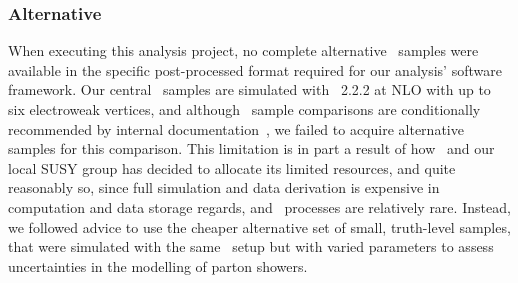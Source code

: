 \subsubsection{Alternative \diboson}
\label{sec:2ljets_diboson_alt}
When executing this analysis project, no complete alternative \diboson\ samples
were available in the specific post-processed format required for our analysis'
software framework.
Our central \diboson\ samples are simulated with \sherpa~2.2.2 at NLO with up
to six electroweak vertices, and although \diboson\ sample comparisons are
conditionally recommended by internal
documentation~\cite{atlas_twiki_susytheoretical}, we failed to acquire
alternative samples for this comparison.
This limitation is in part a result of how \atlas\ and our local SUSY group has
decided to allocate its limited resources, and quite reasonably so, since
full simulation and data derivation is expensive in computation and data
storage regards, and \diboson\ processes are relatively rare.
Instead, we followed advice to use the cheaper alternative set of small,
truth-level samples, that were simulated with the same \sherpa\ setup but with
varied parameters to assess uncertainties in the modelling of parton showers.

